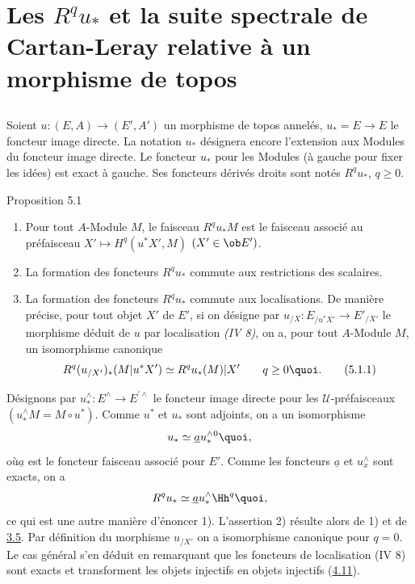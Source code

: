 \section{Les $R^qu_*$ et la suite spectrale de Cartan-Leray relative à un morphisme de topos}

\setcounter{subsection}{-1}
\subsection{}
Soient $u : (E, A) \to (E', A')$ un morphisme de topos annelés, $u_\ast
= E \to E$ le foncteur image directe. La notation $u_\ast$ désignera
encore l'extension aux Modules du foncteur image directe. Le foncteur
$u_\ast$ pour les Modules (à gauche pour fixer les idées) est exact
à gauche. Ses foncteurs dérivés droits sont notés
$R^qu_{\ast}$, $q \geq 0$.

\begin{enonce*}{Proposition 5.1}
\begin{enumerate}
\renewcommand{\labelenumi}{\theenumi)}
\item Pour tout $A$-Module $M$, le faisceau  $R^qu_\ast M$ est le
  faisceau associé au préfaisceau $X' \mapsto H^q(u^\ast X', M)$ $(X'
  \in \ob E')$.

\item La formation des foncteurs $R^{q}u_{\ast}$ commute aux
  restrictions des scalaires.

\item La formation des foncteurs  $R^qu_\ast$ commute aux
  localisations. De manière précise, pour tout objet $X'$ de $E'$,
  si on désigne par $u_{/X} : E_{/u^{\ast}X'} \to E'_{/X'}$ le
  morphisme déduit de $u$ par localisation \emph{(IV 8)}, on a, pour tout
  $A$-Module $M$, un isomorphisme canonique
\begin{equation*}
R^q(u_{/X'})_\ast (M |u^\ast X') \simeq  R^qu_\ast (M) | X' \qquad q \geq
0{\quoi}.\tag{5.1.1}
\end{equation*}
\end{enumerate}
\end{enonce*}

Désignons par $u^{\wedge}_\ast :
E^{\wedge} \to E^{\prime\wedge}$ le foncteur
image directe pour les $𝒰$-préfaisceaux
$(u^{\wedge}_\ast M = M ∘ u^{\ast})$.
Comme $u^\ast$ et $u_\ast$ sont adjoints, on a un
isomorphisme
$$
u_\ast \simeq \underline{a} u^{\wedge}_\ast {}^{0}{\quoi}, %
$$
où\pageoriginale $\underline{a}$ est le foncteur faisceau associé pour
$E'$. Comme les
foncteurs $\underline{a}$ et $u^{\wedge}_x$ sont exacts, on a
$$
R^q u_\ast\simeq \underline{a}
u^{\wedge}_\ast\Hh^q{\quoi},
$$
ce qui est une autre manière d'énoncer 1). L'assertion 2) résulte
alors de 1) et de \hyperref[V.cor3.5]{3.5}. Par définition du morphisme
$u_{/X'}$ on a isomorphisme canonique  pour $q = 0$. Le
cas général s'en déduit en remarquant que les foncteurs de
localisation (IV 8) sont exacts et transforment les objets injectifs
en objets injectifs (\hyperref[V.prop4.11]{4.11}).

